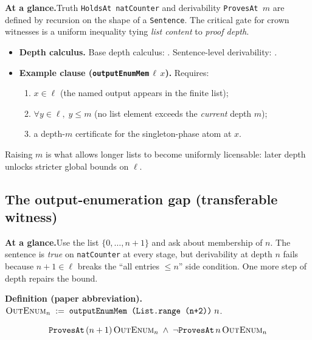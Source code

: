 \documentclass[11pt,a4paper]{article}
\newenvironment{witnessmeta}{%
  \par\smallskip
  \begin{tcolorbox}[
    enhanced, breakable=false,
    colback=gray!7, colframe=gray!55, boxrule=0.45pt, arc=2pt,
    left=8pt, right=8pt, top=5pt, bottom=5pt,
    before skip=0.25\baselineskip, after skip=0.4\baselineskip,
    fontupper=\small
  ]
}{\end{tcolorbox}}
\theoremstyle{definition}
\begin{document}
\begin{witnessmeta}
\textbf{At a glance.}\quad Truth \texttt{HoldsAt natCounter} and derivability \texttt{ProvesAt $m$} are defined by recursion on the shape of a \texttt{Sentence}. The critical gate for crown witnesses is a uniform inequality tying \emph{list content} to \emph{proof depth}.
\end{witnessmeta}

\begin{itemize}[leftmargin=1.6em, itemsep=0.35em]
\item \textbf{Depth calculus.} Base depth calculus: . Sentence-level derivability: .
\item \textbf{Example clause (\texttt{outputEnumMem}\,$\ell\,x$).} Requires:
  \begin{enumerate}[label=(\alph*), leftmargin=1.4em, itemsep=0.2em, topsep=2pt]
  \item $x\in\ell$ (the named output appears in the finite list);
  \item $\forall y\in\ell,\; y\le m$ (no list element exceeds the \emph{current} depth $m$);
  \item a depth-$m$ certificate for the singleton-phase atom at $x$.
  \end{enumerate}
\end{itemize}

\noindent
Raising $m$ is what allows longer lists to become uniformly licensable: later depth unlocks stricter global bounds on $\ell$.

\subsection{The output-enumeration gap (transferable witness)}

\begin{witnessmeta}
\textbf{At a glance.}\quad Use the list $\{0,\ldots,n+1\}$ and ask about membership of $n$. The sentence is \emph{true} on \texttt{natCounter} at every stage, but derivability at depth $n$ fails because $n+1\in\ell$ breaks the ``all entries $\le n$'' side condition. One more step of depth repairs the bound.
\end{witnessmeta}

\noindent\textbf{Definition (paper abbreviation).}\quad
$\textsc{OutEnum}_n \;:=\; \texttt{outputEnumMem (List.range (n+2))}\; n$.

\[
  \texttt{ProvesAt}\,(n+1)\,\textsc{OutEnum}_n \;\wedge\; \neg\texttt{ProvesAt}\,n\,\textsc{OutEnum}_n
\]
\end{document}
